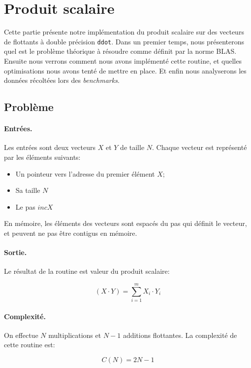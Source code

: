 \section{Produit scalaire}

Cette partie présente notre implémentation du produit scalaire sur des vecteurs de flottants à double précision \texttt{ddot}. Dans un premier temps, nous présenterons quel est le problème théorique à résoudre comme définit par la norme BLAS. Ensuite nous verrons comment nous avons implémenté cette routine, et quelles optimisations nous avons tenté de mettre en place. Et enfin nous analyserons les données récoltées lors des \emph{benchmarks}.

\subsection{Problème}

\paragraph{Entrées.} Les entrées sont deux vecteurs $X$ et $Y$ de taille $N$. Chaque vecteur est représenté par les éléments suivants:
\begin{itemize}
\item Un pointeur vers l'adresse du premier élément $X$;
\item Sa taille $N$
\item Le pas $incX$
\end{itemize}
En mémoire, les éléments des vecteurs sont espacés du pas qui définit le vecteur, et peuvent ne pas être contigus en mémoire.

\paragraph{Sortie.} Le résultat de la routine est valeur du produit scalaire:

\begin{equation}
    (X \cdot Y) = \sum\limits_{i=1}^m X_i \cdot Y_i
\end{equation}

\paragraph{Complexité.} On effectue $N$ multiplications et $N-1$ additions flottantes. La complexité de cette routine est:

\begin{equation}
    C(N) = 2N-1
\end{equation}

